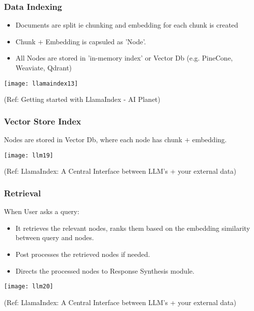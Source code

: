 \begin{frame}[fragile]\frametitle{Data Indexing}

\begin{itemize}
\item Documents are split ie chunking and embedding for each chunk is created
\item Chunk $+$ Embedding is capsuled as 'Node'.
\item All Nodes are stored in 'in-memory index' or Vector Db (e.g. PineCone, Weaviate, Qdrant)
\end{itemize}	

\begin{center}
\texttt{[image: llamaindex13]}

{\tiny (Ref: Getting started with LlamaIndex - AI Planet)}
\end{center}
\end{frame}



\begin{frame}[fragile]\frametitle{Vector Store Index}

Nodes are stored in Vector Db, where each node has chunk $+$ embedding.

\begin{center}
\texttt{[image: llm19]}

{\tiny (Ref: LlamaIndex: A Central Interface between LLM's + your external data)}
\end{center}
\end{frame}

\begin{frame}[fragile]\frametitle{Retrieval}

When User asks a query:
\begin{itemize}
\item It retrieves the relevant nodes, ranks them based on the embedding similarity between query and nodes.
\item Post processes the retrieved nodes if needed.
\item Directs the processed nodes to Response Synthesis module.
\end{itemize}	



\begin{center}
\texttt{[image: llm20]}

{\tiny (Ref: LlamaIndex: A Central Interface between LLM's + your external data)}
\end{center}
\end{frame}

